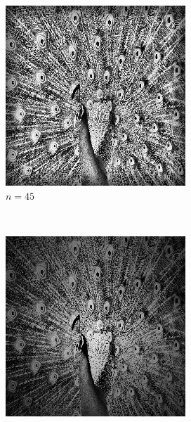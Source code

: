\documentclass{article}
\begin{document}
\begin{enumerate}[label=(\alph*)]
\begin{figure}[!htb]
        \begin{subfigure}[b]{0.3\textwidth}
            \includegraphics[width=\textwidth]{img/L45.png}
            \caption{$n = 45$}
        \end{subfigure}
        ~
        \begin{subfigure}[b]{0.3\textwidth}
            \includegraphics[width=\textwidth]{img/L255.png}

\end{subfigure}
\end{figure}
\end{enumerate}
\end{document}
